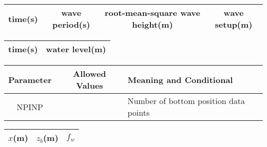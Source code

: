 \documentclass[11pt,oneside]{book}
\begin{document}
\begin{table}[h]
\begin{center}
\begin{tabular}{||c|c|p{8cm}||}
\end{tabular}
\end{center}
\begin{center}
\begin{tabular}{||c|c|c|c||}\hline
time(s) & wave period(s) & root-mean-square wave height(m)& wave setup(m)\\ \hline
\end{tabular}
\end{center}
\begin{center}
\begin{tabular}{||c|c||}\hline
time(s) & water level(m)\\ \hline
\end{tabular}
\end{center}
\begin{center}
\begin{tabular}{||c|c|p{8cm}||}\hline
Parameter& Allowed Values   & Meaning and Conditional  \\ \hline \hline
NPINP &  & Number of bottom position data points  \\ \hline
\end{tabular}
\end{center}
\begin{center}
\begin{tabular}{||c|c|c||}\hline
$x$(m) & $z_b$(m) & $f_w$\\ \hline
\end{tabular}
\end{center}
\end{table}

\clearpage
\end{document}
